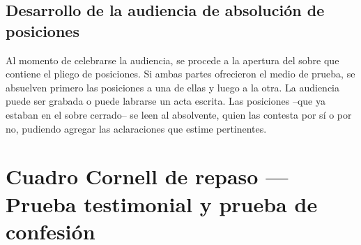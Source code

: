 \documentclass[12pt,oneside]{book}
\begin{document}
\section{Desarrollo de la audiencia de absolución de posiciones}

Al momento de celebrarse la audiencia, se procede a la apertura del sobre que contiene el pliego de posiciones. Si ambas partes ofrecieron el medio de prueba, se absuelven primero las posiciones a una de ellas y luego a la otra. La audiencia puede ser grabada o puede labrarse un acta escrita. Las posiciones --que ya estaban en el sobre cerrado-- se leen al absolvente, quien las contesta por sí o por no, pudiendo agregar las aclaraciones que estime pertinentes.

\chapter*{Cuadro Cornell de repaso --- Prueba testimonial y prueba de confesión}
\end{document}
